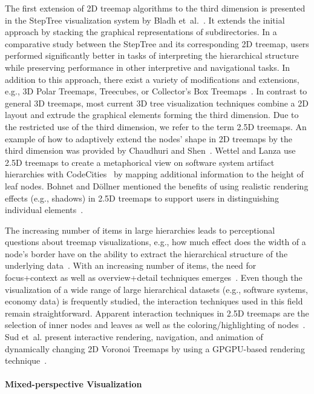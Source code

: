 The first extension of 2D treemap algorithms to the third dimension is presented in the StepTree visualization system by Bladh et~al.~\cite{Bladh2004}. It extends the initial approach by stacking the graphical representations of subdirectories.
In a comparative study between the StepTree and its corresponding 2D treemap, users performed significantly better in tasks of interpreting the hierarchical structure while preserving performance in other interpretive and navigational tasks.
In addition to this approach, there exist a variety of modifications and extensions, e.g., 3D Polar Treemaps, Treecubes, or Collector's Box Treemaps~\cite{Schulz2011}.
In contrast to general 3D treemaps, most current 3D tree visualization techniques combine a 2D layout and extrude the graphical elements forming the third dimension.
Due to the restricted use of the third dimension, we refer to the term 2.5D treemaps.
An example of how to adaptively extend the nodes' shape in 2D treemaps by the third dimension was provided by Chaudhuri and Shen~\cite{Chaudhuri2009}.
Wettel and Lanza use 2.5D treemaps to create a metaphorical view on software system artifact hierarchies with CodeCities~\cite{Wettel2007} by mapping additional information to the height of leaf nodes.
Bohnet and D{\"o}llner mentioned the benefits of using realistic rendering effects (e.g., shadows) in 2.5D treemaps to support users in distinguishing individual elements~\cite{Bohnet2011}.

The increasing number of items in large hierarchies leads to perceptional questions about treemap visualizations, e.g., how much effect does the width of a node's border have on the ability to extract the hierarchical structure of the underlying data~\cite{Kong2010}.
With an increasing number of items, the need for focus+context as well as overview+detail techniques emerges~\cite{Hauser2006}.
Even though the visualization of a wide range of large hierarchical datasets (e.g., software systems, economy data) is frequently studied, the interaction techniques used in this field remain straightforward.
Apparent interaction techniques in 2.5D treemaps are the selection of inner nodes and leaves as well as the coloring/highlighting of nodes~\cite{Wettel2007}.
Sud et~al. present interactive rendering, navigation, and animation of dynamically changing 2D Voronoi Treemaps by using a GPGPU-based rendering technique~\cite{Sud2010}.

\paragraph{Mixed-perspective Visualization}

